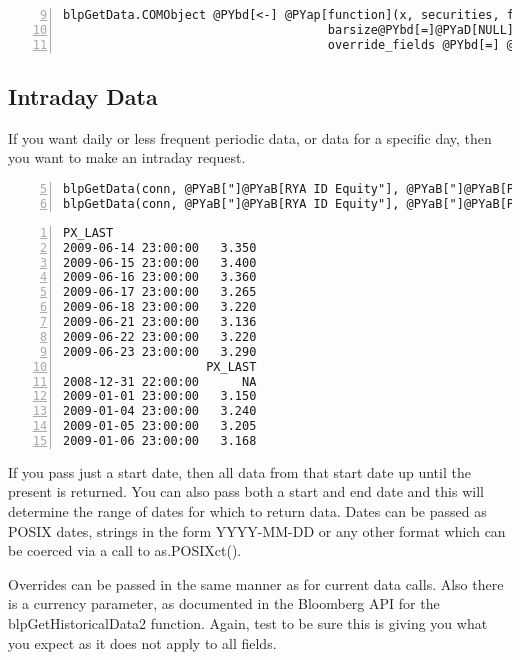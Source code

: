 \documentclass[a4paper]{article}
\begin{document}
\begin{Verbatim}[commandchars=@\[\],numbers=left,firstnumber=9,stepnumber=1]
blpGetData.COMObject @PYbd[<-] @PYap[function](x, securities, fields, start@PYbd[=]@PYaD[NULL], end@PYbd[=]@PYaD[NULL],
                                     barsize@PYbd[=]@PYaD[NULL], barfields@PYbd[=]@PYaD[NULL], retval@PYbd[=]@PYaD[NULL], 
                                     override_fields @PYbd[=] @PYaD[NULL], overrides @PYbd[=] @PYaD[NULL], currency @PYbd[=] @PYaD[NULL], ...){
\end{Verbatim}

    

\subsection{Intraday Data} %
\label{sub:intraday_data}

If you want daily or less frequent periodic data, or data for a specific day, then you want to make an intraday request.


\begin{Verbatim}[commandchars=@\[\],numbers=left,firstnumber=5,stepnumber=1]
blpGetData(conn, @PYaB["]@PYaB[RYA ID Equity"], @PYaB["]@PYaB[PX_LAST"], Sys.Date() @PYbd[-] @PYaR[10])
blpGetData(conn, @PYaB["]@PYaB[RYA ID Equity"], @PYaB["]@PYaB[PX_LAST"], @PYaB["]@PYaB[2009-01-01"], @PYaB["]@PYaB[2009-01-07"])
\end{Verbatim}

    

\begin{Verbatim}[commandchars=@\[\],numbers=left,firstnumber=1,stepnumber=1]
                    PX_LAST
2009-06-14 23:00:00   3.350
2009-06-15 23:00:00   3.400
2009-06-16 23:00:00   3.360
2009-06-17 23:00:00   3.265
2009-06-18 23:00:00   3.220
2009-06-21 23:00:00   3.136
2009-06-22 23:00:00   3.220
2009-06-23 23:00:00   3.290
                    PX_LAST
2008-12-31 22:00:00      NA
2009-01-01 23:00:00   3.150
2009-01-04 23:00:00   3.240
2009-01-05 23:00:00   3.205
2009-01-06 23:00:00   3.168
\end{Verbatim}

    

If you pass just a start date, then all data from that start date up until the present is returned. You can also pass both a start and end date and this will determine the range of dates for which to return data. Dates can be passed as POSIX dates, strings in the form YYYY-MM-DD or any other format which can be coerced via a call to as.POSIXct().

Overrides can be passed in the same manner as for current data calls. Also there is a currency parameter, as documented in the Bloomberg API for the blpGetHistoricalData2 function. Again, test to be sure this is giving you what you expect as it does not apply to all fields.




\end{document}
